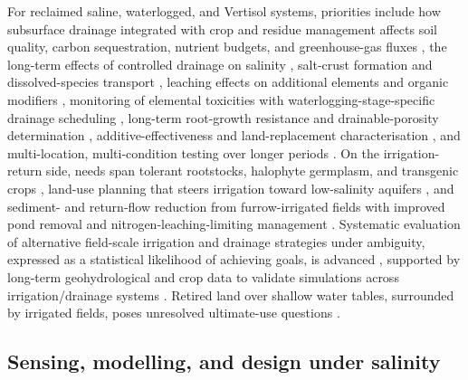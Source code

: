 For reclaimed saline, waterlogged, and Vertisol systems, priorities include how
subsurface drainage integrated with crop and residue management affects soil
quality, carbon sequestration, nutrient budgets, and greenhouse-gas fluxes
\parencite{Mukhopadhyay2023,Mukhopadhyay2023b}, the long-term effects of
controlled drainage on salinity \parencite{ElGhannam2023}, salt-crust formation
and dissolved-species transport \parencite{Colombani2016}, leaching effects on
additional elements and organic modifiers \parencite{SoltaniGerdefaramarzi2020},
monitoring of elemental toxicities with waterlogging-stage-specific drainage
scheduling \parencite{Qian2021}, long-term root-growth resistance and
drainable-porosity determination \parencite{Bahçeci2018,Bahceci2008},
additive-effectiveness and land-replacement characterisation \parencite{Isa2023},
and multi-location, multi-condition testing over longer periods
\parencite{Sadhukhan2019}. On the irrigation-return side, needs span tolerant
rootstocks, halophyte germplasm, and transgenic crops \parencite{Cuevas2019},
land-use planning that steers irrigation toward low-salinity aquifers
\parencite{Bethune2008}, and sediment- and return-flow reduction from
furrow-irrigated fields with improved pond removal and nitrogen-leaching-limiting
management \parencite{Bjorneberg2020}. Systematic evaluation of alternative
field-scale irrigation and drainage strategies under ambiguity, expressed as a
statistical likelihood of achieving goals, is advanced \parencite{Alzraiee2013},
supported by long-term geohydrological and crop data to validate simulations
across irrigation/drainage systems \parencite{Yao2017}. Retired land over shallow
water tables, surrounded by irrigated fields, poses unresolved ultimate-use
questions \parencite{Purkey2001}.

\subsection{Sensing, modelling, and design under salinity}


